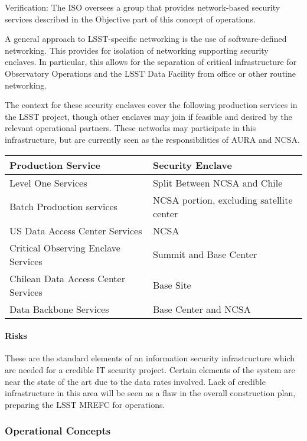 Verification: The ISO oversees a group that provides network-based security 
services described in the Objective part of this concept of operations.

A general approach to LSST-specific networking is the use of software-defined 
networking. This provides for isolation of networking supporting security enclaves. 
In particular, this allows for the separation of critical infrastructure for 
Observatory Operations and the LSST Data Facility from office or other routine 
networking.

The context for these security enclaves cover the following production services 
in the LSST project, though other enclaves may join if feasible and desired by 
the relevant operational partners. These networks may participate in this 
infrastructure, but are currently seen as the responsibilities of AURA and NCSA.

\begin{longtable}{|p{}|p{}|} \hline
\textbf{Production Service} & \textbf{Security Enclave} \\\hline
Level One Services & Split Between NCSA and Chile  \\\hline
Batch Production services & NCSA portion, excluding satellite center \\\hline
US Data Access Center Services & NCSA \\\hline
Critical Observing Enclave Services & Summit and Base Center \\\hline
Chilean Data Access Center Services & Base Site \\\hline
Data Backbone Services & Base Center and NCSA \\\hline
\end{longtable}

\paragraph{Risks}

These are the standard elements of an information security infrastructure which 
are needed for a credible IT security project. Certain elements of the system 
are near the state of the art due to the data rates involved. Lack of credible 
infrastructure in this area will be seen as a flaw in the overall construction 
plan, preparing the LSST MREFC for operations.

\subsubsection{Operational Concepts}

